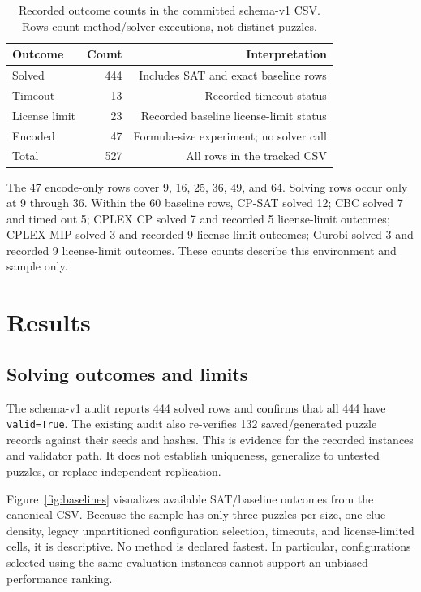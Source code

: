 \IfFileExists{cas-sc.cls}{\documentclass[a4paper,fleqn]{cas-sc}}{\documentclass[a4paper,11pt]{article}}
\begin{document}
\begin{table}[ht]
\centering
\caption{Recorded outcome counts in the committed schema-v1 CSV. Rows count method/solver executions, not distinct puzzles.}
\begin{tabular}{lrr}
\toprule
Outcome & Count & Interpretation \\
\midrule
Solved & 444 & Includes SAT and exact baseline rows \\
Timeout & 13 & Recorded timeout status \\
License limit & 23 & Recorded baseline license-limit status \\
Encoded & 47 & Formula-size experiment; no solver call \\
\midrule
Total & 527 & All rows in the tracked CSV \\
\bottomrule
\end{tabular}
\end{table}

The 47 encode-only rows cover 9, 16, 25, 36, 49, and 64. Solving rows occur only at 9 through 36. Within the 60 baseline rows, CP-SAT solved 12; CBC solved 7 and timed out 5; CPLEX CP solved 7 and recorded 5 license-limit outcomes; CPLEX MIP solved 3 and recorded 9 license-limit outcomes; Gurobi solved 3 and recorded 9 license-limit outcomes. These counts describe this environment and sample only.

\section{Results}
\subsection{Solving outcomes and limits}
The schema-v1 audit reports 444 solved rows and confirms that all 444 have \texttt{valid=True}. The existing audit also re-verifies 132 saved/generated puzzle records against their seeds and hashes. This is evidence for the recorded instances and validator path. It does not establish uniqueness, generalize to untested puzzles, or replace independent replication.

Figure~\ref{fig:baselines} visualizes available SAT/baseline outcomes from the canonical CSV. Because the sample has only three puzzles per size, one clue density, legacy unpartitioned configuration selection, timeouts, and license-limited cells, it is descriptive. No method is declared fastest. In particular, configurations selected using the same evaluation instances cannot support an unbiased performance ranking.
\end{document}
